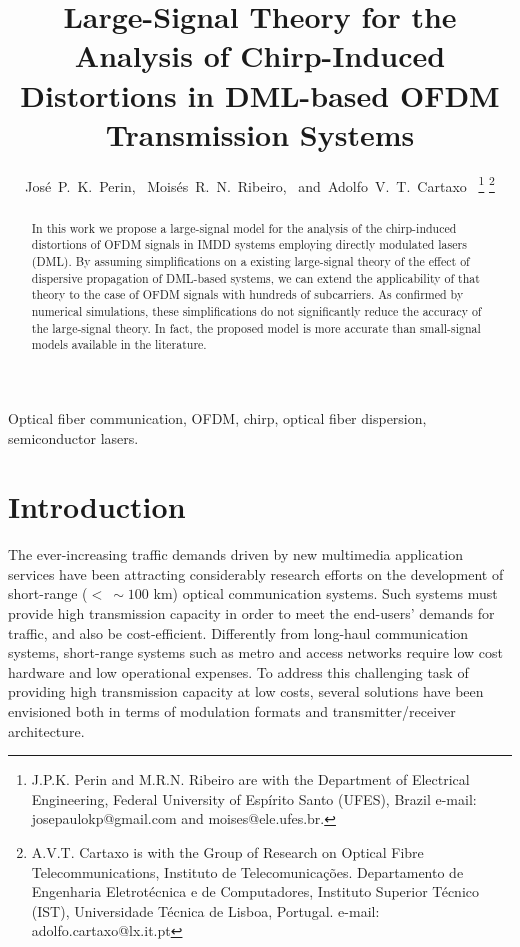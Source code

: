 \documentclass[journal]{IEEEtran}
\makeatletter
\def\markboth#1#2{\def\leftmark{\@IEEEcompsoconly{\sffamily}\MakeUppercase{\protect#1}}%
\def\rightmark{\@IEEEcompsoconly{\sffamily}\MakeUppercase{\protect#2}}}
\makeatother
\begin{document}
\title{Large-Signal Theory for the Analysis of Chirp-Induced Distortions in DML-based OFDM Transmission Systems}
\author{José~P.~K.~Perin,~\IEEEmembership{}
        Moisés~R.~N.~Ribeiro,~\IEEEmembership{}
        and~Adolfo~V.~T.~Cartaxo~\IEEEmembership{}%
\thanks{J.P.K. Perin and M.R.N. Ribeiro are with the Department
of Electrical Engineering, Federal University of Espírito Santo (UFES), Brazil e-mail: josepaulokp@gmail.com and moises@ele.ufes.br.}%
\thanks{A.V.T. Cartaxo is with the Group of Research on Optical Fibre Telecommunications, Instituto de Telecomunicações. Departamento de Engenharia Eletrotécnica e de Computadores, Instituto Superior Técnico (IST), Universidade Técnica de Lisboa, Portugal. e-mail: adolfo.cartaxo@lx.it.pt}%
}

\markboth{JOURNAL OF LIGHTWAVE TECHNOLOGY, VOL. ~XX, NO. ~X, JANUARY ~XXXX}{}%
\maketitle
\begin{abstract}
In this work we propose a large-signal model for the analysis of the chirp-induced distortions of OFDM signals in IMDD systems employing directly modulated lasers (DML). By assuming simplifications on a existing large-signal theory of the effect of dispersive propagation of DML-based systems, we can extend the applicability of that theory to the case of OFDM signals with hundreds of subcarriers. As confirmed by numerical simulations, these simplifications do not significantly reduce the accuracy of the large-signal theory. In fact, the proposed model is more accurate than small-signal models available in the literature.
\end{abstract}

\begin{IEEEkeywords}
Optical fiber communication, OFDM, chirp, optical fiber dispersion, semiconductor lasers.
\end{IEEEkeywords}

\section{Introduction}
The ever-increasing traffic demands driven by new multimedia application services have been attracting considerably research efforts on the development of short-range ($<~\sim 100$ km) optical communication systems. Such systems must provide high transmission capacity in order to meet the end-users' demands for traffic, and also be cost-efficient. Differently from long-haul communication systems, short-range systems such as metro and access networks require low cost hardware and low operational expenses. To address this challenging task of providing high transmission capacity at low costs, several solutions have been envisioned both in terms of modulation formats and transmitter/receiver architecture. 
\end{document}
